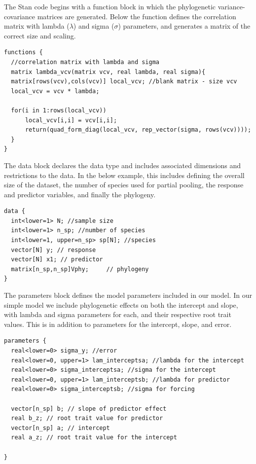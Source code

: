 \documentclass[11pt]{article}
\begin{document}
The Stan code begins with a function block in which the phylogenetic variance-covariance matrices are generated. Below the function defines the correlation matrix with lambda ($\lambda$) and sigma ($\sigma$) parameters, and generates a matrix of the correct size and scaling.\\

\begin{verbatim}
functions {
  //correlation matrix with lambda and sigma
  matrix lambda_vcv(matrix vcv, real lambda, real sigma){ 
  matrix[rows(vcv),cols(vcv)] local_vcv; //blank matrix - size vcv
  local_vcv = vcv * lambda; 
  
  for(i in 1:rows(local_vcv))
      local_vcv[i,i] = vcv[i,i]; 
      return(quad_form_diag(local_vcv, rep_vector(sigma, rows(vcv))));
  }
}
\end{verbatim}

The data block declares the data type and includes associated dimensions and restrictions to the data. In the below example, this includes defining the overall size of the dataset, the number of species used for partial pooling, the response and predictor variables, and finally the phylogeny. \\

\begin{verbatim}
data {
  int<lower=1> N; //sample size
  int<lower=1> n_sp; //number of species
  int<lower=1, upper=n_sp> sp[N]; //species
  vector[N] y; // response
  vector[N] x1; // predictor
  matrix[n_sp,n_sp]Vphy;     // phylogeny
}
\end{verbatim}

The parameters block defines the model parameters included in our model. In our simple model we include phylogenetic effects on both the intercept and slope, with lambda and sigma parameters for each, and their respective root trait values. This is in addition to parameters for the intercept, slope, and error.\\

\begin{verbatim}
parameters {
  real<lower=0> sigma_y; //error    
  real<lower=0, upper=1> lam_interceptsa; //lambda for the intercept       
  real<lower=0> sigma_interceptsa; //sigma for the intercept
  real<lower=0, upper=1> lam_interceptsb; //lambda for predictor    
  real<lower=0> sigma_interceptsb; //sigma for forcing
  
  vector[n_sp] b; // slope of predictor effect
  real b_z; // root trait value for predictor    
  vector[n_sp] a; // intercept
  real a_z; // root trait value for the intercept

}
\end{verbatim}
\end{document}
